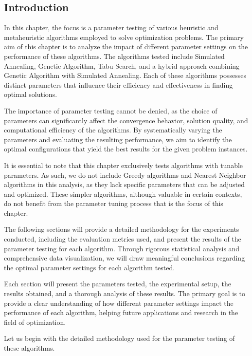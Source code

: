 \documentclass[
]{article}
\begin{document}
    \subsection{Introduction}\label{subsec:introduction2}

    In this chapter, the focus is a parameter testing of various heuristic and metaheuristic algorithms employed to solve optimization problems. The primary aim of this chapter is to analyze the impact of different parameter settings on the performance of these algorithms. The algorithms tested include Simulated Annealing, Genetic Algorithm, Tabu Search, and a hybrid approach combining Genetic Algorithm with Simulated Annealing. Each of these algorithms possesses distinct parameters that influence their efficiency and effectiveness in finding optimal solutions.

    The importance of parameter testing cannot be denied, as the choice of parameters can significantly affect the convergence behavior, solution quality, and computational efficiency of the algorithms. By systematically varying the parameters and evaluating the resulting performance, we aim to identify the optimal configurations that yield the best results for the given problem instances.

    It is essential to note that this chapter exclusively tests algorithms with tunable parameters. As such, we do not include Greedy algorithms and Nearest Neighbor algorithms in this analysis, as they lack specific parameters that can be adjusted and optimized. These simpler algorithms, although valuable in certain contexts, do not benefit from the parameter tuning process that is the focus of this chapter.

    The following sections will provide a detailed methodology for the experiments conducted, including the evaluation metrics used, and present the results of the parameter testing for each algorithm. Through rigorous statistical analysis and comprehensive data visualization, we will draw meaningful conclusions regarding the optimal parameter settings for each algorithm tested.

    Each section will present the parameters tested, the experimental setup, the results obtained, and a thorough analysis of these results. The primary goal is to provide a clear understanding of how different parameter settings impact the performance of each algorithm, helping future applications and research in the field of optimization.

    \noindent Let us begin with the detailed methodology used for the parameter testing of these algorithms.
\end{document}
